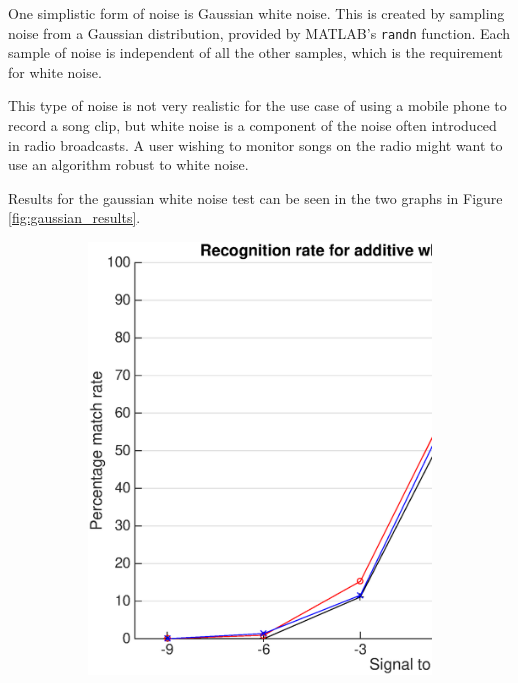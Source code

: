\documentclass[12pt,a4paper,twoside,openright]{report}
\begin{document}
One simplistic form of noise is Gaussian white noise. This is created by sampling noise from a Gaussian distribution, provided by MATLAB's \lstinline{randn} function. Each sample of noise is independent of all the other samples, which is the requirement for white noise.

This type of noise is not very realistic for the use case of using a mobile phone to record a song clip, but white noise is a component of the noise often introduced in radio broadcasts. A user wishing to monitor songs on the radio might want to use an algorithm robust to white noise.

Results for the gaussian white noise test can be seen in the two graphs in Figure \ref{fig:gaussian_results}. 

\begin{figure}[p]
    \centering

    \begin{subfigure}{\textwidth}
      \includegraphics[width=\textwidth]{./figs/gaussian_philips_results.eps}
    \end{subfigure}


\end{figure}
\end{document}
